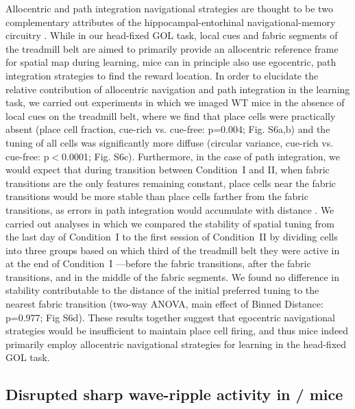 Allocentric and path integration navigational strategies are thought to be two complementary attributes of the hippocampal-entorhinal navigational-memory circuitry \citep{Buzsaki2013, Etienne2004, Gothard1996, Moser2015}. While in our head-fixed GOL task, local cues and fabric segments of the treadmill belt are aimed to primarily provide an allocentric reference frame for spatial map during learning, mice can in principle also use egocentric, path integration strategies to find the reward location. In order to elucidate the relative contribution of allocentric navigation and path integration in the learning task, we carried out experiments in which we imaged WT mice in the absence of local cues on the treadmill belt, where we find that place cells were practically absent (place cell fraction, cue-rich vs. cue-free: p=0.004; Fig. S6a,b) and the tuning of all cells was significantly more diffuse (circular variance, cue-rich vs. cue-free: p$<$0.0001; Fig. S6c). Furthermore, in the case of path integration, we would expect that during transition between Condition~I and II, when fabric transitions are the only features remaining constant, place cells near the fabric transitions would be more stable than place cells farther from the fabric transitions, as errors in path integration would accumulate with distance \citep{Etienne2004, Gothard1996}. We carried out analyses in which we compared the stability of spatial tuning from the last day of Condition~I to the first session of Condition~II by dividing cells into three groups based on which third of the treadmill belt they were active in at the end of Condition~I —before the fabric transitions, after the fabric transitions, and in the middle of the fabric segments. We found no difference in stability contributable to the distance of the initial preferred tuning to the nearest fabric transition (two-way ANOVA, main effect of Binned Distance: p=0.977; Fig S6d). These results together suggest that egocentric navigational strategies would be insufficient to maintain place cell firing, and thus mice indeed primarily employ allocentric navigational strategies for learning in the head-fixed GOL task.

\subsection{Disrupted sharp wave-ripple activity in \df/ mice}


